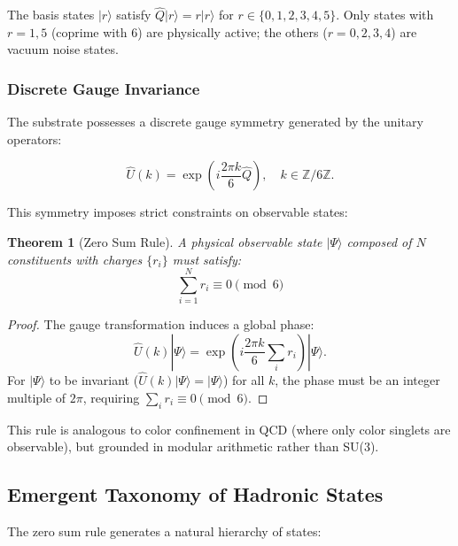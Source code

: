 \documentclass[11pt, a4paper]{article}
\theoremstyle{plain}
\newtheorem{theorem}{Theorem}[section]
\theoremstyle{definition}
\newcommand{\Zmod}{\mathbb{Z}/6\mathbb{Z}}
\begin{document}
The basis states $|r\rangle$ satisfy $\hat{Q}|r\rangle = r|r\rangle$ for $r \in \{0,1,2,3,4,5\}$. Only states with $r=1,5$ (coprime with 6) are physically active; the others ($r=0,2,3,4$) are vacuum noise states.

\subsubsection{Discrete Gauge Invariance}

The substrate possesses a discrete gauge symmetry generated by the unitary operators:

\begin{equation}
\hat{U}(k) = \exp\left(i\frac{2\pi k}{6}\hat{Q}\right), \quad k \in \Zmod.
\end{equation}

This symmetry imposes strict constraints on observable states:

\begin{theorem}[Zero Sum Rule]
A physical observable state $|\Psi\rangle$ composed of $N$ constituents with charges $\{r_i\}$ must satisfy:
\begin{equation}
\sum_{i=1}^N r_i \equiv 0 \pmod{6}
\label{eq:zero_sum_rule}
\end{equation}
\end{theorem}

\begin{proof}
The gauge transformation induces a global phase:
\begin{equation}
\hat{U}(k)|\Psi\rangle = \exp\left(i\frac{2\pi k}{6}\sum_i r_i\right)|\Psi\rangle.
\end{equation}
For $|\Psi\rangle$ to be invariant ($\hat{U}(k)|\Psi\rangle = |\Psi\rangle$) for all $k$, the phase must be an integer multiple of $2\pi$, requiring $\sum_i r_i \equiv 0 \pmod{6}$.
\end{proof}

This rule is analogous to color confinement in QCD (where only color singlets are observable), but grounded in modular arithmetic rather than SU(3).

\subsection{Emergent Taxonomy of Hadronic States}

The zero sum rule generates a natural hierarchy of states:
\end{document}
